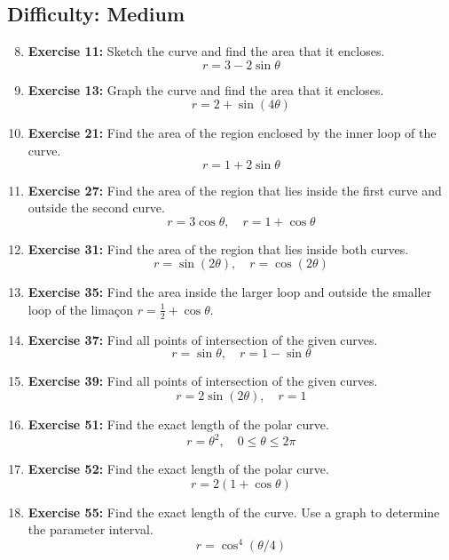 \subsection*{Difficulty: Medium}

\begin{enumerate}
    \setcounter{enumi}{7}
    \item \textbf{Exercise 11:} Sketch the curve and find the area that it encloses.
    \[ r = 3 - 2\sin\theta \]

    \item \textbf{Exercise 13:} Graph the curve and find the area that it encloses.
    \[ r = 2 + \sin(4\theta) \]

    \item \textbf{Exercise 21:} Find the area of the region enclosed by the inner loop of the curve.
    \[ r = 1 + 2\sin\theta \]
    
    \item \textbf{Exercise 27:} Find the area of the region that lies inside the first curve and outside the second curve.
    \[ r = 3\cos\theta, \quad r = 1 + \cos\theta \]

    \item \textbf{Exercise 31:} Find the area of the region that lies inside both curves.
    \[ r = \sin(2\theta), \quad r = \cos(2\theta) \]

    \item \textbf{Exercise 35:} Find the area inside the larger loop and outside the smaller loop of the limaçon $r = \frac{1}{2} + \cos\theta$.

    \item \textbf{Exercise 37:} Find all points of intersection of the given curves.
    \[ r = \sin\theta, \quad r = 1 - \sin\theta \]

    \item \textbf{Exercise 39:} Find all points of intersection of the given curves.
    \[ r = 2\sin(2\theta), \quad r = 1 \]

    \item \textbf{Exercise 51:} Find the exact length of the polar curve.
    \[ r = \theta^2, \quad 0 \le \theta \le 2\pi \]

    \item \textbf{Exercise 52:} Find the exact length of the polar curve.
    \[ r = 2(1 + \cos\theta) \]

    \item \textbf{Exercise 55:} Find the exact length of the curve. Use a graph to determine the parameter interval.
    \[ r = \cos^4(\theta/4) \]


\end{enumerate}
